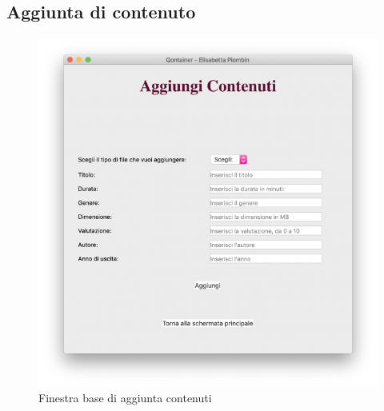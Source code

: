 \documentclass[a4paper,10pt]{article}
\begin{document}
\subsection{Aggiunta di contenuto}
\begin{figure}[H]
	\begin{center}
		\includegraphics[width=\textwidth,keepaspectratio]{immagini/AggiungiContenuti.png}
	\end{center}
	\caption{\label{fig:my-label} Finestra base di aggiunta contenuti}
\end{figure}
\end{document}
